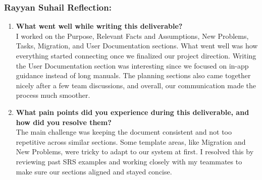 \subsubsection*{Rayyan Suhail Reflection:}
\begin{enumerate}
  \item \textbf{What went well while writing this deliverable?} \\
  I worked on the Purpose, Relevant Facts and Assumptions, New Problems, Tasks, Migration, and User Documentation sections. What went well was how everything started connecting once we finalized our project direction. Writing the User Documentation section was interesting since we focused on in-app guidance instead of long manuals. The planning sections also came together nicely after a few team discussions, and overall, our communication made the process much smoother.

  \item \textbf{What pain points did you experience during this deliverable, and how did you resolve them?} \\
  The main challenge was keeping the document consistent and not too repetitive across similar sections. Some template areas, like Migration and New Problems, were tricky to adapt to our system at first. I resolved this by reviewing past SRS examples and working closely with my teammates to make sure our sections aligned and stayed concise.
\end{enumerate}





